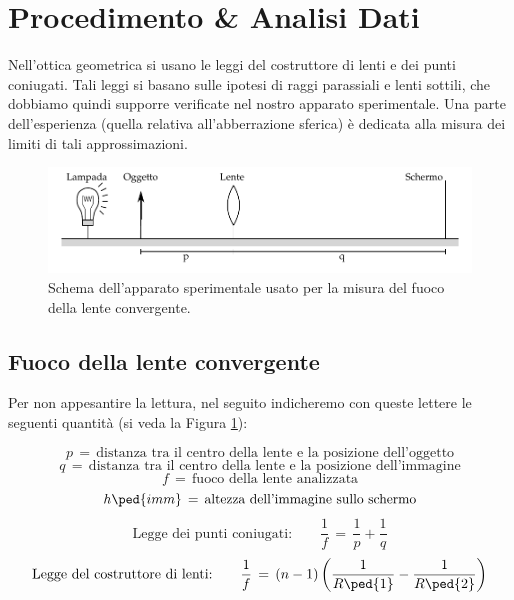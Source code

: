 \section{Procedimento \& Analisi Dati}

Nell'ottica geometrica si usano le leggi del costruttore di lenti e dei punti coniugati.
Tali leggi si basano sulle ipotesi di raggi parassiali e lenti sottili, che dobbiamo quindi supporre verificate
nel nostro apparato sperimentale. Una parte dell'esperienza (quella relativa all'abberrazione sferica)
è dedicata alla misura dei limiti di tali approssimazioni.

\begin{figure}[b!]
	\includegraphics[width=16cm]{drawing.pdf}
    \caption{Schema dell'apparato sperimentale usato per la misura del fuoco della lente convergente.}
    \label{fig:conv}
\end{figure}

\subsection{Fuoco della lente convergente}

Per non appesantire la lettura, nel seguito indicheremo con queste lettere le seguenti quantità (si veda la Figura \ref{fig:conv}):

\begin{equation*}
	p \,=\, \text{distanza tra il centro della lente e la posizione dell'oggetto}
\end{equation*}
\begin{equation*}
	q \,=\, \text{distanza tra il centro della lente e la posizione dell'immagine}
\end{equation*}
\begin{equation*}
	f \,=\, \text{fuoco della lente analizzata}
\end{equation*}
\begin{equation*}
	h \ped{imm} \,=\, \text{altezza dell'immagine sullo schermo}
\end{equation*}
\begin{equation}
	\text{Legge dei punti coniugati:} \qquad \frac{1}{f} \,=\, \frac{1}{p} + \frac{1}{q}
	\label{eq:coniugati}
\end{equation}
\begin{equation}
	\text{Legge del costruttore di lenti:} \qquad \frac{1}{f} \,=\, (n-1)\left(\frac{1}{R\ped{1}}-\frac{1}{R\ped{2}}\right)
	\label{eq:costruttore}
\end{equation}


